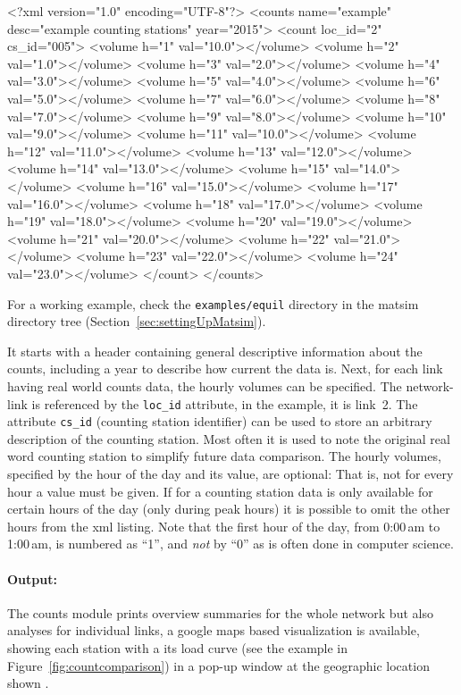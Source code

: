 \begin{xml}
<?xml version="1.0" encoding="UTF-8"?> 
<counts name="example" desc="example counting stations" year="2015"> 
   <count loc_id="2" cs_id="005"> 
      <volume h="1" val="10.0"></volume> 
      <volume h="2" val="1.0"></volume> 
      <volume h="3" val="2.0"></volume> 
      <volume h="4" val="3.0"></volume> 
      <volume h="5" val="4.0"></volume> 
      <volume h="6" val="5.0"></volume> 
      <volume h="7" val="6.0"></volume> 
      <volume h="8" val="7.0"></volume> 
      <volume h="9" val="8.0"></volume> 
      <volume h="10" val="9.0"></volume> 
      <volume h="11" val="10.0"></volume> 
      <volume h="12" val="11.0"></volume> 
      <volume h="13" val="12.0"></volume> 
      <volume h="14" val="13.0"></volume> 
      <volume h="15" val="14.0"></volume> 
      <volume h="16" val="15.0"></volume> 
      <volume h="17" val="16.0"></volume> 
      <volume h="18" val="17.0"></volume> 
      <volume h="19" val="18.0"></volume> 
      <volume h="20" val="19.0"></volume> 
      <volume h="21" val="20.0"></volume> 
      <volume h="22" val="21.0"></volume> 
      <volume h="23" val="22.0"></volume> 
      <volume h="24" val="23.0"></volume> 
   </count> 
</counts>
\end{xml}
For a working example, check the \lstinline{examples/equil} directory in the \gls{matsim} directory tree (\cf Section~\ref{sec:settingUpMatsim}).

It starts with a header containing general descriptive information about the counts, including a year to describe how current the data is. Next, for each link having real world counts data, the hourly volumes can be specified. The network-link is referenced by the \lstinline|loc_id| attribute, in the example, it is link~2. The attribute \lstinline|cs_id| (counting station identifier) can be used to store an arbitrary description of the counting station. Most often it is used to note the original real word counting station to simplify future data comparison. The hourly volumes, specified by the hour of the day and its value, are optional: That is, not for every hour a value must be given. If for a counting station data is only available for certain hours of the day (\eg only during peak hours) it is possible to omit the other hours from the \gls{xml} listing. Note that the first hour of the day, from 0:00\,am to 1:00\,am, is numbered as ``1'', and \emph{not} by ``0'' as is often done in computer science.

\paragraph{Output:}
The counts module prints overview summaries for the whole network but also analyses for individual links, \ie a google maps based visualization is available, showing each station with a its load curve (see the example in Figure~\ref{fig:countcomparison}) in a pop-up window at the geographic location shown .

